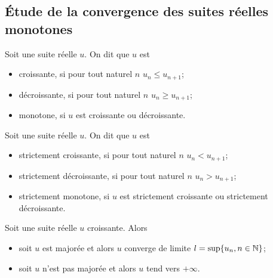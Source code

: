 \subsection{Étude de la convergence des suites réelles monotones}

\begin{defdef}
  Soit une suite réelle \(u\). On dit que \(u\) est
  \begin{itemize}
    \item croissante, si pour tout naturel \(n\) \(u_n \leqslant u_{n+1}\);
    \item décroissante, si pour tout naturel \(n\) \(u_n \geqslant u_{n+1}\);
    \item monotone, si \(u\) est croissante ou décroissante.
  \end{itemize}
\end{defdef}
\begin{defdef}
  Soit une suite réelle \(u\). On dit que \(u\) est
  \begin{itemize}
    \item strictement croissante, si pour tout naturel \(n\) \(u_n < u_{n+1}\);
    \item strictement décroissante, si pour tout naturel \(n\) \(u_n > 
      u_{n+1}\);
    \item strictement monotone, si \(u\) est strictement croissante ou 
      strictement décroissante.
  \end{itemize}
\end{defdef}
\begin{theo}
  Soit une suite réelle \(u\) croissante. Alors
  \begin{itemize}
    \item soit \(u\) est majorée et alors \(u\) converge de limite \(l = 
      \sup\{u_n, n \in \mathbb{N}\}\);
    \item soit \(u\) n'est pas majorée et alors \(u\) tend vers \(+\infty\).
  \end{itemize}
\end{theo}
